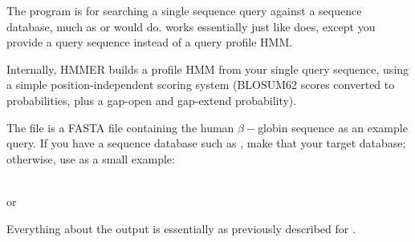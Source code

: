 The  program is for searching a single sequence query
against a sequence database, much as  or 
would do.  works essentially just like 
does, except you provide a query sequence instead of a query profile
HMM. 

Internally, HMMER builds a profile HMM from your single query
sequence, using a simple position-independent scoring system (BLOSUM62
scores converted to probabilities, plus a gap-open and gap-extend
probability).

The file  is a FASTA file containing the
human $\beta-$globin sequence as an example query. If you have a
sequence database such as , make that your
target database; otherwise, use  as a
small example:

\\
or\\

Everything about the output is essentially as previously described for
. 




















